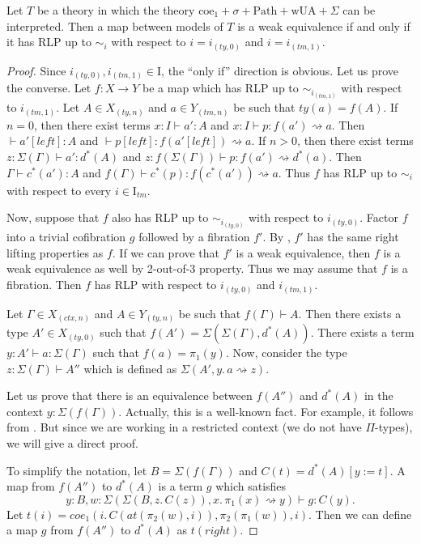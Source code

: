 \documentclass{mscs}
\newcommand{\repl}{:=}
\newcommand{\wUA}{\mathrm{wUA}}
\newcommand{\coeT}{\mathrm{coe}}
\newcommand{\PathT}{\mathrm{Path}}
\newcommand{\leftI}{\mathit{left}}
\newcommand{\rightI}{\mathit{right}}
\newcommand{\coe}{\mathit{coe}}
\newcommand{\idtype}{\rightsquigarrow}
\newcommand{\at}{\mathit{at}}
\newcommand{\I}{\mathrm{I}}
\numberwithin{figure}{section}
\begin{document}
\begin{prop}[sigma-we-i]
Let $T$ be a theory in which the theory $\coeT_1 + \sigma + \PathT + \wUA + \Sigma$ can be interpreted.
Then a map between models of $T$ is a weak equivalence if and only if it has RLP up to $\sim_i$ with respect to $i = i_{(ty,0)}$ and $i = i_{(tm,1)}$.
\end{prop}
\begin{proof}
Since $i_{(ty,0)},i_{(tm,1)} \in \I$, the ``only if'' direction is obvious.
Let us prove the converse.
Let $f : X \to Y$ be a map which has RLP up to $\sim_{i_{(tm,1)}}$ with respect to $i_{(tm,1)}$.
Let $A \in X_{(ty,n)}$ and $a \in Y_{(tm,n)}$ be such that $ty(a) = f(A)$.
If $n = 0$, then there exist terms $x : I \vdash a' : A$ and $x : I \vdash p : f(a') \idtype a$.
Then $\vdash a'[\leftI] : A$ and $\vdash p[\leftI] : f(a'[\leftI]) \idtype a$.
If $n > 0$, then there exist terms $z : \Sigma(\Gamma) \vdash a' : d^*(A)$ and $z : f(\Sigma(\Gamma)) \vdash p : f(a') \idtype d^*(a)$.
Then $\Gamma \vdash c^*(a') : A$ and $f(\Gamma) \vdash c^*(p) : f(c^*(a')) \idtype a$.
Thus $f$ has RLP up to $\sim_i$ with respect to every $i \in \I_{tm}$.

Now, suppose that $f$ also has RLP up to $\sim_{i_{(ty,0)}}$ with respect to $i_{(ty,0)}$.
Factor $f$ into a trivial cofibration $g$ followed by a fibration $f'$.
By \cite[lemma~3.4]{f-model-structures}, $f'$ has the same right lifting properties as $f$.
If we can prove that $f'$ is a weak equivalence, then $f$ is a weak equivalence as well by 2-out-of-3 property.
Thus we may assume that $f$ is a fibration.
Then $f$ has RLP with respect to $i_{(ty,0)}$ and $i_{(tm,1)}$.

Let $\Gamma \in X_{(ctx,n)}$ and $A \in Y_{(ty,n)}$ be such that $f(\Gamma) \vdash A$.
Then there exists a type $A' \in X_{(ty,0)}$ such that $f(A') = \Sigma(\Sigma(\Gamma), d^*(A))$.
There exists a term $y : A' \vdash a : \Sigma(\Gamma)$ such that $f(a) = \pi_1(y)$.
Now, consider the type $z : \Sigma(\Gamma) \vdash A''$ which is defined as $\Sigma(A', y.\,a \idtype z)$.

Let us prove that there is an equivalence between $f(A'')$ and $d^*(A)$ in the context $y : \Sigma(f(\Gamma))$.
Actually, this is a well-known fact.
For example, it follows from \cite[lemmas 3.11.8 and 3.11.9]{hottbook}.
But since we are working in a restricted context (we do not have $\Pi$-types), we will give a direct proof.

To simplify the notation, let $B = \Sigma(f(\Gamma))$ and $C(t) = d^*(A)[y \repl t]$.
A map from $f(A'')$ to $d^*(A)$ is a term $g$ which satisfies
\[ y : B, w : \Sigma(\Sigma(B, z.\,C(z)), x.\,\pi_1(x) \idtype y) \vdash g : C(y). \]
Let $t(i) = \coe_1(i.\,C(\at(\pi_2(w),i)), \pi_2(\pi_1(w)), i)$.
Then we can define a map $g$ from $f(A'')$ to $d^*(A)$ as $t(\rightI)$.


\end{proof}
\end{document}
